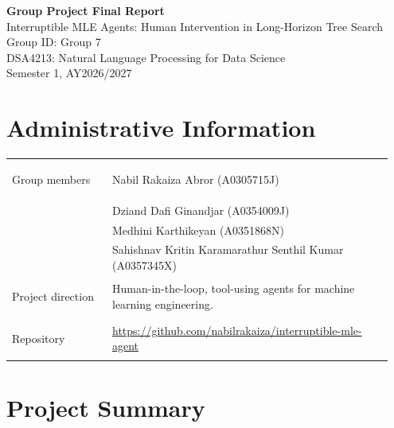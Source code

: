 \documentclass[11pt]{article}
\newcommand{\course}{DSA4213: Natural Language Processing for Data Science}
\newcommand{\semester}{Semester 1, AY2026/2027}
\begin{document}
\begin{center}
{\LARGE\bfseries Group Project Final Report}\\[0.4em]
{\large Interruptible MLE Agents: Human Intervention in Long-Horizon Tree Search}\\[0.9em]
Group ID: Group 7\\[0.9em]
\course\\
\semester
\end{center}

\section*{Administrative Information}

\begin{tabular}{@{}>{\bfseries\raggedright\arraybackslash}p{0.25\linewidth}
                    >{\raggedright\arraybackslash}p{0.70\linewidth}@{}}
Group members & Nabil Rakaiza Abror (A0305715J) \\
               & Dziand Dafi Ginandjar (A0354009J) \\
               & Medhini Karthikeyan (A0351868N) \\
               & Sahishnav Kritin Karamarathur Senthil Kumar (A0357345X) \\[0.7em]
Project direction & Human-in-the-loop, tool-using agents for machine learning
                    engineering. \\[0.7em]
Repository & \url{https://github.com/nabilrakaiza/interruptible-mle-agent} \\
\end{tabular}

\section*{Project Summary}
\end{document}
